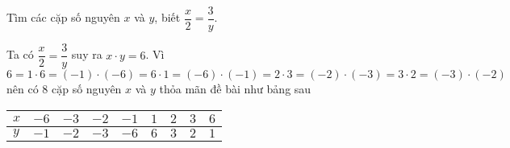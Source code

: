 \begin{bt}%
 Tìm các cặp số nguyên $x$ và $y$, biết $\dfrac{x}{2}=\dfrac{3}{y}$.
 \loigiai
  {
  Ta có $\dfrac{x}{2}=\dfrac{3}{y}$ suy ra $x \cdot y = 6$.
  Vì $6=1\cdot6 = (-1)\cdot(-6)=6\cdot1 = (-6)\cdot(-1) = 2\cdot3 = (-2)\cdot(-3) =3\cdot2 =(-3)\cdot(-2)$ nên có $8$ cặp số nguyên $x$ và $y$ thỏa mãn đề bài như bảng sau
  \begin{center}
   \begin{tabular}{|>{\centering\arraybackslash}m{1cm}|>{\centering\arraybackslash}m{1cm}|>{\centering\arraybackslash}m{1cm}|>{\centering\arraybackslash}m{1cm}|>{\centering\arraybackslash}m{1cm}|>{\centering\arraybackslash}m{1cm}|>{\centering\arraybackslash}m{1cm}|>{\centering\arraybackslash}m{1cm}|>{\centering\arraybackslash}m{1cm}|}
  	\hline
  	$x$ & $-6$ & $-3$ & $-2$ & $-1$ & $1$ & $2$ & $3$ & $6$ \\ \hline
  	$y$ & $-1$ & $-2$ & $-3$ & $-6$ & $6$ & $3$ & $2$ & $1$\\ \hline
   \end{tabular}
  \end{center}
  }
\end{bt}

